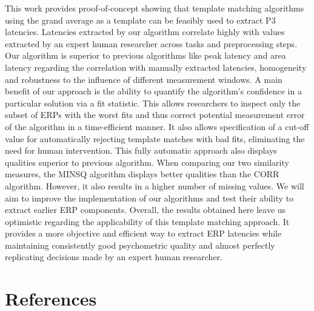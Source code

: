 \documentclass[
  man]{apa7}
\begin{document}
This work provides proof-of-concept showing that template matching algorithms using the grand average as a template can be feasibly used to extract P3 latencies. Latencies extracted by our algorithm correlate highly with values extracted by an expert human researcher across tasks and preprocessing steps. Our algorithm is superior to previous algorithms like peak latency and area latency regarding the correlation with manually extracted latencies, homogeneity and robustness to the influence of different measurement windows. A main benefit of our approach is the ability to quantify the algorithm's confidence in a particular solution via a fit statistic. This allows researchers to inspect only the subset of ERPs with the worst fits and thus correct potential measurement error of the algorithm in a time-efficient manner. It also allows specification of a cut-off value for automatically rejecting template matches with bad fits, eliminating the need for human intervention. This fully automatic approach also displays qualities superior to previous algorithm. When comparing our two similarity measures, the MINSQ algorithm displays better qualities than the CORR algorithm. However, it also results in a higher number of missing values. We will aim to improve the implementation of our algorithms and test their ability to extract earlier ERP components. Overall, the results obtained here leave us optimistic regarding the applicability of this template matching approach. It provides a more objective and efficient way to extract ERP latencies while maintaining consistently good psychometric quality and almost perfectly replicating decisions made by an expert human researcher.

\newpage

\hypertarget{references}{%
\section{References}\label{references}}
\end{document}
